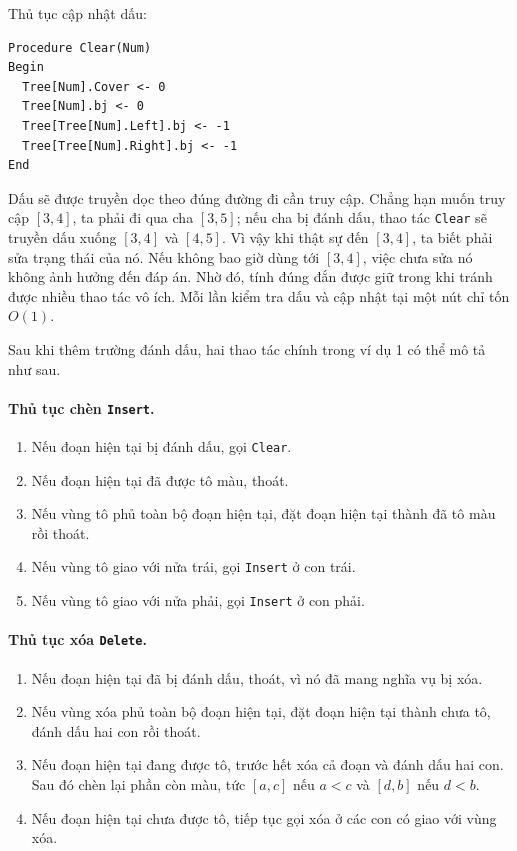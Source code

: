 \documentclass[11pt]{article}
\begin{document}
Thủ tục cập nhật dấu:
\begin{verbatim}
Procedure Clear(Num)
Begin
  Tree[Num].Cover <- 0
  Tree[Num].bj <- 0
  Tree[Tree[Num].Left].bj <- -1
  Tree[Tree[Num].Right].bj <- -1
End
\end{verbatim}

Dấu sẽ được truyền dọc theo đúng đường đi cần truy cập. Chẳng hạn muốn truy
cập $[3,4]$, ta phải đi qua cha $[3,5]$; nếu cha bị đánh dấu, thao tác
\texttt{Clear} sẽ truyền dấu xuống $[3,4]$ và $[4,5]$. Vì vậy khi thật sự đến
$[3,4]$, ta biết phải sửa trạng thái của nó. Nếu không bao giờ dùng tới
$[3,4]$, việc chưa sửa nó không ảnh hưởng đến đáp án. Nhờ đó, tính đúng đắn
được giữ trong khi tránh được nhiều thao tác vô ích. Mỗi lần kiểm tra dấu và
cập nhật tại một nút chỉ tốn $O(1)$.

Sau khi thêm trường đánh dấu, hai thao tác chính trong ví dụ 1 có thể mô tả
như sau.

\paragraph{Thủ tục chèn \texttt{Insert}.}
\begin{enumerate}
  \item Nếu đoạn hiện tại bị đánh dấu, gọi \texttt{Clear}.
  \item Nếu đoạn hiện tại đã được tô màu, thoát.
  \item Nếu vùng tô phủ toàn bộ đoạn hiện tại, đặt đoạn hiện tại thành đã tô
  màu rồi thoát.
  \item Nếu vùng tô giao với nửa trái, gọi \texttt{Insert} ở con trái.
  \item Nếu vùng tô giao với nửa phải, gọi \texttt{Insert} ở con phải.
\end{enumerate}

\paragraph{Thủ tục xóa \texttt{Delete}.}
\begin{enumerate}
  \item Nếu đoạn hiện tại đã bị đánh dấu, thoát, vì nó đã mang nghĩa vụ bị
  xóa.
  \item Nếu vùng xóa phủ toàn bộ đoạn hiện tại, đặt đoạn hiện tại thành chưa
  tô, đánh dấu hai con rồi thoát.
  \item Nếu đoạn hiện tại đang được tô, trước hết xóa cả đoạn và đánh dấu hai
  con. Sau đó chèn lại phần còn màu, tức $[a,c]$ nếu $a<c$ và $[d,b]$ nếu
  $d<b$.
  \item Nếu đoạn hiện tại chưa được tô, tiếp tục gọi xóa ở các con có giao
  với vùng xóa.
\end{enumerate}
\end{document}
